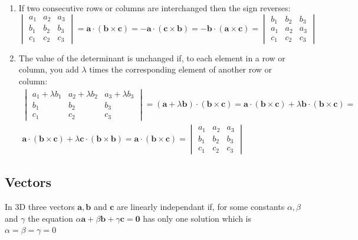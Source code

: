 \documentclass{article}
\renewcommand{\vec}[1]{\bm{#1}}
\newcommand{\vv}[1]{\vec{#1}}
\begin{document}
\begin{enumerate}
   \item If two consecutive rows or columns are interchanged then the sign reverses:
      \[
      \begin{vmatrix}
         a_1 & a_2 & a_3\\
         b_1 & b_2 & b_3\\
         c_1 & c_2 & c_3
      \end{vmatrix}
      =\vv a\cdot(\vv b\times\vv c)=-\vv a\cdot(\vv c\times\vv b)=-\vv b\cdot(\vv a\times\vv c)=
      \begin{vmatrix}
         b_1 & b_2 & b_3\\
         a_1 & a_2 & a_3\\
         c_1 & c_2 & c_3
      \end{vmatrix}
      \]
   \item The value of the determinant is unchanged if, to each element in a row or column, you add \(\lambda\) times the corresponding element of another row or column:
      \begin{multline*}
         \begin{vmatrix}
            a_1+\lambda b_1 & a_2+\lambda b_2 & a_3 +\lambda b_3\\
            b_1 & b_2 & b_3\\
            c_1 & c_2 & c_3
         \end{vmatrix}
         =(\vv a+\lambda\vv b)\cdot(\vv b\times\vv c)=\vv a\cdot(\vv b\times\vv c)+\lambda\vv b\cdot(\vv b\times\vv c)=\\\vv a\cdot(\vv b\times\vv c)+\lambda\vv c\cdot(\vv b\times\vv b)=\vv a\cdot(\vv b\times\vv c)=
         \begin{vmatrix}
            a_1 & a_2 & a_3\\
            b_1 & b_2 & b_3\\
            c_1 & c_2 &c_3
         \end{vmatrix}
      \end{multline*}
\end{enumerate}

\subsection*{Vectors}

In 3D three vectors \(\vv a,\vv b\) and \(\vv c\) are linearly independant if, for some constants \(\alpha,\beta\) and \(\gamma\) the equation \(\alpha\vv a+\beta\vv b+\gamma\vv c=\vv 0\) has only one solution which is \(\alpha=\beta=\gamma=0\)
\end{document}
